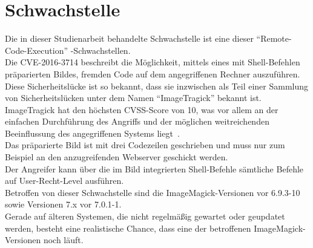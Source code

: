 \section{Schwachstelle}\label{sec:schwachstelle}

Die in dieser Studienarbeit behandelte Schwachstelle ist eine dieser "`Remote-Code-Execution"' -Schwachstellen.\\

Die CVE-2016-3714 beschreibt die Möglichkeit, mittels eines mit Shell-Befehlen präparierten Bildes, fremden Code auf dem angegriffenen Rechner auszuführen.\\

Diese Sicherheitslücke ist so bekannt, dass sie inzwischen als Teil einer Sammlung von Sicherheitslücken unter dem Namen "`ImageTragick"' bekannt ist.\\

ImageTragick hat den höchsten CVSS-Score von 10, was vor allem an der einfachen Durchführung des Angriffs und der möglichen weitreichenden Beeinflussung des angegriffenen Systems liegt~\cite{ImagemagickProductsVulnerabilities}.\\
Das präparierte Bild ist mit drei Codezeilen geschrieben und muss nur zum Beispiel an den anzugreifenden Webserver geschickt werden.\\
Der Angreifer kann über die im Bild integrierten Shell-Befehle sämtliche Befehle auf User-Recht-Level ausführen.\\

Betroffen von dieser Schwachstelle sind die ImageMagick-Versionen vor 6.9.3-10 sowie Versionen 7.x vor 7.0.1-1.\\
Gerade auf älteren Systemen, die nicht regelmäßig gewartet oder geupdatet werden, besteht eine realistische Chance, dass eine der betroffenen ImageMagick-Versionen noch läuft.\\